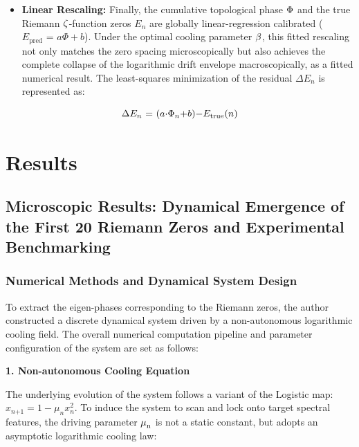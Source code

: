\documentclass[mca,article,submit,oneauthor,pdftex]{Definitions/mdpi}
\begin{document}
\begin{itemize}
\item
  \textbf{Linear Rescaling:} Finally, the cumulative
  topological phase \(\text{\ensuremath{\Phi}}\) and the true Riemann
  \(\text{\ensuremath{\zeta}}\)-function zeros \({E}_{{n}}\) are globally
  linear-regression calibrated
  (\({E}_{\text{pred}}\text{~=~}{a}{\ensuremath{\Phi}+}{b}\)). Under
  the optimal cooling parameter \(\text{\ensuremath{\beta}}\), this fitted rescaling not only
  matches the zero spacing microscopically but also achieves the
  complete collapse of the logarithmic drift envelope macroscopically,
  as a fitted numerical result. The
  least-squares minimization of the residual
  \({\ensuremath{\Delta}}{E}_{{n}}\) is represented as:
\end{itemize}

\begin{equation}
\text{\ensuremath{\Delta}}{E}_{{n}}\text{~=~(}{a}\text{\ensuremath{\cdot}}\text{\ensuremath{\Phi}}_{{n}}\text{+}{b}\text{)\ensuremath{-}}{E}_{\text{true}}\text{(}{n}\text{)}
\end{equation}

\section{Results}\label{sec:results}

\subsection{Microscopic Results: Dynamical Emergence of the First 20 Riemann Zeros and Experimental Benchmarking}

\subsubsection{Numerical Methods and Dynamical System Design}

To extract the eigen-phases corresponding to the Riemann zeros, the author
constructed a discrete dynamical system driven by a non-autonomous
logarithmic cooling field. The overall numerical computation pipeline
and parameter configuration of the system are set as follows:

\textbf{1. Non-autonomous Cooling Equation}

The underlying evolution of the system follows a variant of the Logistic
map:
\({x}_{{n}{+1}}{ = 1\ensuremath{- }}{\ensuremath{\mu}}_{{n}}{x}_{{n}}^{{2}}\).
To induce the system to scan and lock onto target spectral features, the
driving parameter \(\text{\ensuremath{\mu}}_{\text{n}}\) is not a static constant, but
adopts an asymptotic logarithmic cooling law:
\end{document}
